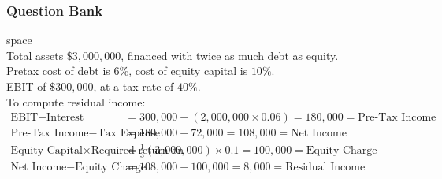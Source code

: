\subsubsection{Question Bank}

\begin{qnbank}{\color{white}space}\\
Total assets $\$3,000,000$, financed with twice as much debt as equity.\\
Pretax cost of debt is $6\%$, cost of equity capital is $10\%$.\\
EBIT of $\$300,000$, at a tax rate of $40\%$.\\
To compute residual income:
\begin{align}
\text{EBIT} - \text{Interest} &= 300,000 - (2,000,000 \times 0.06) = 180,000 = \text{Pre-Tax Income} \nonumber \\
\text{Pre-Tax Income} - \text{Tax Expense} &= 180,000 - 72,000 = 108,000 = \text{Net Income} \nonumber \\
\text{Equity Capital} \times \text{Required return on equity} &= \frac{1}{3}(3,000,000) \times 0.1 = 100,000 = \text{Equity Charge} \nonumber \\
\text{Net Income} - \text{Equity Charge} &= 108,000 - 100,000 = 8,000 = \text{Residual Income} \nonumber
\end{align}
\end{qnbank}